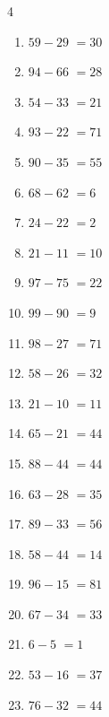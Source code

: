 \begin{multicols}{4}
\begin{enumerate}
  \item $59-29$
        $=30$

  \item $94-66$
        $=28$

  \item $54-33$
        $=21$

  \item $93-22$
        $=71$

  \item $90-35$
        $=55$

  \item $68-62$
        $=6$

  \item $24-22$
        $=2$

  \item $21-11$
        $=10$

  \item $97-75$
        $=22$

  \item $99-90$
        $=9$

  \item $98-27$
        $=71$

  \item $58-26$
        $=32$

  \item $21-10$
        $=11$

  \item $65-21$
        $=44$

  \item $88-44$
        $=44$

  \item $63-28$
        $=35$

  \item $89-33$
        $=56$

  \item $58-44$
        $=14$

  \item $96-15$
        $=81$

  \item $67-34$
        $=33$

\columnbreak %

  \item $6-5$
        $=1$

  \item $53-16$
        $=37$

  \item $76-32$
        $=44$


\end{enumerate}
\end{multicols}
